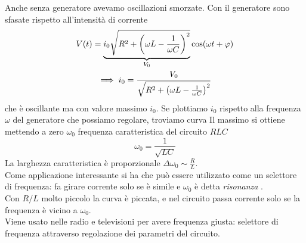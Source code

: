 Anche senza generatore avevamo oscillazioni smorzate. Con il generatore sono sfasate rispetto all'intensità di corrente
\begin{gather*}
	V(t)=\underbrace{i_0 \sqrt{R^2 +\left(\omega L-\frac{1}{\omega C}\right)^2}}_{V_0} \cos(\omega t+\oldphi) \\
	\implies i_0=\frac{V_0}{\sqrt{R^2 +\left(\omega L-\frac{1}{\omega C}\right)^2}}
\end{gather*}
che è oscillante ma con valore massimo $i_0$. Se plottiamo $i_0$ rispetto alla frequenza $\omega$ del generatore che possiamo regolare, troviamo curva
Il massimo si ottiene mettendo a zero $\omega_0$ frequenza caratteristica del circuito $RLC$	
\begin{equation*}
	\omega_0=\frac{1}{\sqrt{LC}}
\end{equation*}
La larghezza caratteristica è proporzionale $\Delta\omega_0\sim\frac{R}{L}$.\\
Come applicazione interessante si ha che può essere utilizzato come un selettore di frequenza: fa girare corrente solo se è simile e $\omega_0$ è detta \textit{risonanza} .\\
Con $R/L$ molto piccolo la curva è piccata, %
e nel circuito passa corrente solo se la frequenza è vicino a $\omega_0$.\\
Viene usato nelle radio e televisioni per avere frequenza giusta: selettore di frequenza attraverso regolazione dei parametri del circuito.




